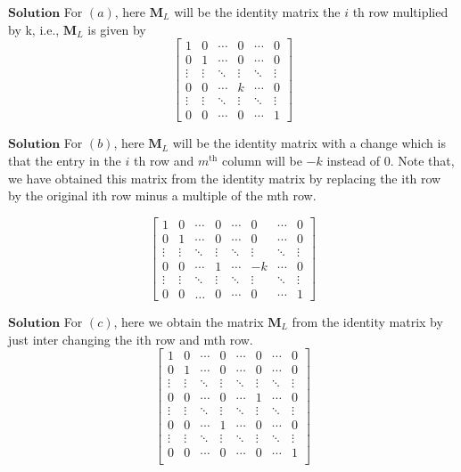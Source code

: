 \documentclass{article}
\begin{document}
\begin{flushleft}
$\boxed{\textbf{Solution}}$  For $(a)$, here $\mathbf{M}_{L}$ will be the identity matrix the $i$ th row multiplied by k, i.e., $\mathbf{M}_{L}$ is given by
$$\begin{bmatrix}{1} & {0} & {\cdots} & {0} & {\cdots} & {0} \\ {0} & {1} & {\cdots} & {0} & {\cdots} & {0} \\ {\vdots} & {\vdots} & {\ddots} & {\vdots} & {\ddots} & {\vdots} \\ {0} & {0} & {\cdots} & {k} & {\cdots} & {0} \\ {\vdots} & {\vdots} & {\ddots} & {\vdots} & {\ddots} & {\vdots} \\ {0} & {0} & {\cdots} & {0} & {\cdots} & {1}\end{bmatrix}$$




$\boxed{\textbf{Solution}}$  For $(b)$, here $\mathbf{M}_{L}$ will be the identity matrix with a change which is that the entry in the $i$ th row and $m^{\text{th}}$ column will be $-k$ instead of $0$. Note that, we have obtained this matrix from the identity matrix by replacing the ith row by the original ith row minus a multiple of the mth row.

$$\begin{bmatrix}
1 & 0 & \cdots & 0 & \cdots & 0&\cdots&0 \\ 
0 & 1 & \cdots  & 0 & \cdots &0&\cdots& 0\\ 
\vdots & \vdots & \ddots & \vdots & \ddots &\vdots&\ddots &\vdots\\ 
0 & 0 & \cdots & 1 &\cdots & -k &\cdots &0 \\ 
\vdots & \vdots & \ddots & \vdots  &\ddots &\vdots &\ddots &\vdots\\
0&0&\dots&0&\cdots&0&\cdots&1
\end{bmatrix}$$




$\boxed{\textbf{Solution}}$  For $(c)$, here we obtain the matrix $\mathbf{M}_{L}$ from the identity matrix by just inter changing the ith row and mth row.
$$\begin{bmatrix}
1& 0  &\cdots  & 0 & \cdots & 0 & \cdots &0 \\ 
0&1  &\cdots  &0  & \cdots & 0 & \cdots & 0\\ 
\vdots& \vdots & \ddots & \vdots & \ddots & \vdots & \ddots& \vdots\\ 
0 & 0 & \cdots &0  &\cdots  & 1 & \cdots & 0\\ 
 \vdots& \vdots & \ddots & \vdots & \ddots & \vdots & \ddots& \vdots\\ 
0 & 0 & \cdots &1  &\cdots  & 0 & \cdots & 0\\ 
 \vdots& \vdots & \ddots & \vdots & \ddots & \vdots & \ddots& \vdots\\  
0 & 0 & \cdots &0  &\cdots  & 0 & \cdots & 1\\ 
\end{bmatrix}$$






\end{flushleft}
\end{document}

